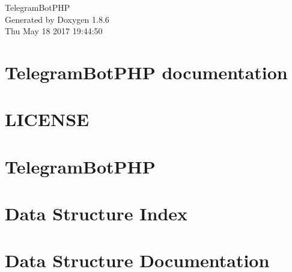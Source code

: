 \documentclass[twoside]{book}
\newcommand{\clearemptydoublepage}{%
  \newpage{\pagestyle{empty}\cleardoublepage}%
}
\begin{document}
\hypersetup{pageanchor=false}
\begin{titlepage}
\vspace*{7cm}
\begin{center}%
{\Large Telegram\-Bot\-P\-H\-P }\\
\vspace*{1cm}
{\large Generated by Doxygen 1.8.6}\\
\vspace*{0.5cm}
{\small Thu May 18 2017 19:44:50}\\
\end{center}
\end{titlepage}
\clearemptydoublepage
\tableofcontents
\clearemptydoublepage
{}
\hypersetup{pageanchor=true}

\chapter{Telegram\-Bot\-P\-H\-P documentation}
\label{index}\hypertarget{index}{}
\chapter{L\-I\-C\-E\-N\-S\-E}
\label{md__home_travis_build__eleirbag89__telegram_bot_p_h_p__l_i_c_e_n_s_e}
\hypertarget{md__home_travis_build__eleirbag89__telegram_bot_p_h_p__l_i_c_e_n_s_e}{}

\chapter{Telegram\-Bot\-P\-H\-P}
\label{md__home_travis_build__eleirbag89__telegram_bot_p_h_p__r_e_a_d_m_e}
\hypertarget{md__home_travis_build__eleirbag89__telegram_bot_p_h_p__r_e_a_d_m_e}{}

\chapter{Data Structure Index}

\chapter{Data Structure Documentation}



\newpage
{}
{}
\printindex
\end{document}
